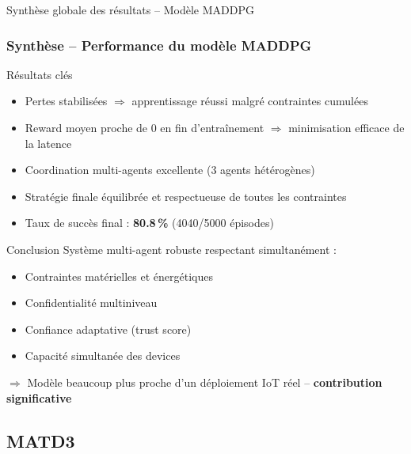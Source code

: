 \documentclass[aspectratio=169]{beamer}
\begin{document}
\begin{frame}{Synthèse globale des résultats – Modèle MADDPG}
\frametitle{Synthèse – Performance du modèle MADDPG}

\begin{block}{Résultats clés}
\begin{itemize}
    \item Pertes stabilisées $\Rightarrow$ apprentissage réussi malgré contraintes cumulées
    \item Reward moyen proche de 0 en fin d’entraînement $\Rightarrow$ minimisation efficace de la latence
    \item Coordination multi-agents excellente (3 agents hétérogènes)
    \item Stratégie finale équilibrée et respectueuse de toutes les contraintes
    \item Taux de succès final : \textbf{80.8\,\%} (4040/5000 épisodes)
\end{itemize}
\end{block}

\begin{exampleblock}{Conclusion}
Système multi-agent robuste respectant simultanément :
\begin{itemize}
    \item Contraintes matérielles et énergétiques
    \item Confidentialité multiniveau
    \item Confiance adaptative (trust score)
    \item Capacité simultanée des devices
\end{itemize}

$\Rightarrow$ Modèle beaucoup plus proche d’un déploiement IoT réel – \textbf{contribution significative}
\end{exampleblock}
\end{frame}

\subsection{MATD3}
\end{document}
